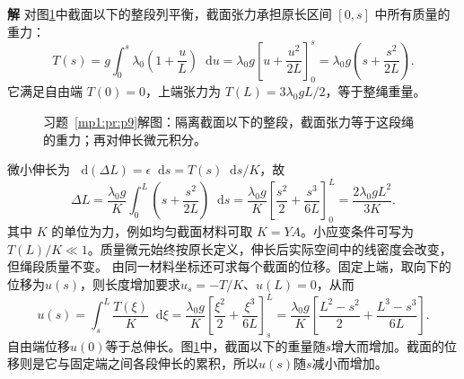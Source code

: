 \documentclass[11pt,openany,fontset=fandol]{ctexbook}
\theoremstyle{definition}\newtheorem{example}{例}[chapter]\newtheorem{exercise}{习题}[chapter]
\newcommand{\SolutionStart}{\par\medskip\ifdim\pagetotal>0pt\ifdim\dimexpr\pagegoal-\pagetotal\relax<3\baselineskip\newpage\fi\fi\noindent\textbf{解}\quad\ignorespaces}
\newenvironment{solution}{\SolutionStart}{\par\medskip}
\newcommand{\dd}{\mathop{}\!\mathrm d}\newcommand{\ee}{\mathrm e}\newcommand{\vct}[1]{\bm{#1}}
\begin{document}
\begin{solution}
对图\ref{mp1:fig:p9-s}中截面以下的整段列平衡，截面张力承担原长区间 $[0,s]$ 中所有质量的重力：
\[
T(s)=g\int_0^s\lambda_0\left(1+\frac uL\right)\dd u
=\lambda_0g\left[u+\frac{u^2}{2L}\right]_0^s
=\lambda_0g\left(s+\frac{s^2}{2L}\right).
\]
它满足自由端 $T(0)=0$，上端张力为 $T(L)=3\lambda_0gL/2$，等于整绳重量。

\begin{figure}[H]\centering

\caption{习题~\ref{mp1:pr:p9}解图：隔离截面以下的整段，截面张力等于这段绳的重力；再对伸长微元积分。}\label{mp1:fig:p9-s}
\end{figure}

微小伸长为 $\dd(\Delta L)=\epsilon\dd s=T(s)\dd s/K$，故
\[
\Delta L=\frac{\lambda_0g}{K}\int_0^L\left(s+\frac{s^2}{2L}\right)\dd s
=\frac{\lambda_0g}{K}\left[\frac{s^2}{2}+\frac{s^3}{6L}\right]_0^L
=\frac{2\lambda_0gL^2}{3K}.
\]
其中 $K$ 的单位为力，例如均匀截面材料可取 $K=YA$。小应变条件可写为 $T(L)/K\ll1$。质量微元始终按原长定义，伸长后实际空间中的线密度会改变，但绳段质量不变。
由同一材料坐标还可求每个截面的位移。固定上端，取向下的位移为$u(s)$，则长度增加要求$u_s=-T/K$、$u(L)=0$，从而
\[
 u(s)=\int_s^L\frac{T(\xi)}K\dd\xi
 =\frac{\lambda_0g}{K}\left[\frac{\xi^2}{2}+\frac{\xi^3}{6L}\right]_s^L
 =\frac{\lambda_0g}{K}
 \left[\frac{L^2-s^2}{2}+\frac{L^3-s^3}{6L}\right].
\]
自由端位移$u(0)$等于总伸长。图\ref{mp1:fig:p9-s}中，截面以下的重量随$s$增大而增加。截面的位移则是它与固定端之间各段伸长的累积，所以$u(s)$随$s$减小而增加。
\end{solution}
\end{document}
